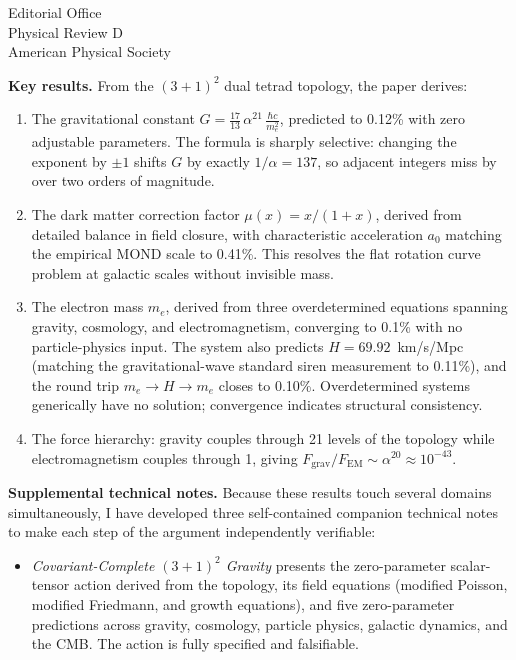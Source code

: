\documentclass[11pt]{letter}
\begin{document}
\begin{letter}{Editorial Office\\Physical Review D\\American Physical Society}

\textbf{Key results.}\quad
From the $(3{+}1)^2$ dual tetrad topology, the paper derives:
%
\begin{enumerate}
\item The gravitational constant $G = \frac{17}{13}\,\alpha^{21}\,\frac{\hbar c}{m_e^2}$, predicted to 0.12\% with zero adjustable parameters.
The formula is sharply selective: changing the exponent by $\pm 1$ shifts $G$ by exactly $1/\alpha = 137$, so adjacent integers miss by over two orders of magnitude.

\item The dark matter correction factor $\mu(x) = x/(1+x)$, derived from detailed balance in field closure, with characteristic acceleration $a_0$ matching the empirical MOND scale to 0.41\%.
This resolves the flat rotation curve problem at galactic scales without invisible mass.

\item The electron mass $m_e$, derived from three overdetermined equations spanning gravity, cosmology, and electromagnetism, converging to 0.1\% with no particle-physics input.
The system also predicts $H = 69.92$~km/s/Mpc (matching the gravitational-wave standard siren measurement to 0.11\%), and the round trip $m_e \to H \to m_e$ closes to 0.10\%.
Overdetermined systems generically have no solution; convergence indicates structural consistency.

\item The force hierarchy: gravity couples through 21 levels of the topology while electromagnetism couples through 1, giving $F_{\mathrm{grav}}/F_{\mathrm{EM}} \sim \alpha^{20} \approx 10^{-43}$.
\end{enumerate}


\textbf{Supplemental technical notes.}\quad
Because these results touch several domains simultaneously, I have developed three self-contained companion technical notes to make each step of the argument independently verifiable:
%
\begin{itemize}
\item \textit{Covariant-Complete $(3{+}1)^2$ Gravity} presents the zero-parameter scalar-tensor action derived from the topology, its field equations (modified Poisson, modified Friedmann, and growth equations), and five zero-parameter predictions across gravity, cosmology, particle physics, galactic dynamics, and the CMB.
The action is fully specified and falsifiable.


\end{itemize}
\end{letter}
\end{document}
